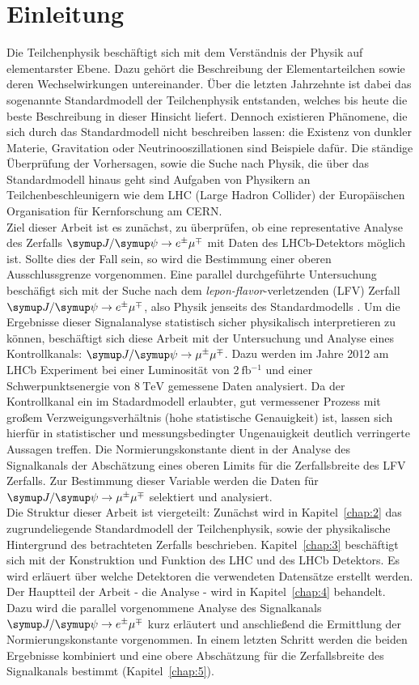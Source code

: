 \chapter{Einleitung}
%
Die Teilchenphysik beschäftigt sich mit dem Verständnis der Physik auf elementarster Ebene. Dazu gehört die Beschreibung der Elementarteilchen sowie deren Wechselwirkungen untereinander. Über die letzten Jahrzehnte ist dabei das sogenannte Standardmodell der Teilchenphysik entstanden, welches bis heute die beste Beschreibung in dieser Hinsicht liefert. Dennoch existieren Phänomene, die sich durch das Standardmodell nicht beschreiben lassen: die Existenz von dunkler Materie, Gravitation oder Neutrinooszillationen sind Beispiele dafür. Die ständige Überprüfung der Vorhersagen, sowie die Suche nach Physik, die über das Standardmodell hinaus geht sind Aufgaben von Physikern an Teilchenbeschleunigern wie dem LHC (Large Hadron Collider) der Europäischen Organisation für Kernforschung am CERN. \\
Ziel dieser Arbeit ist es zunächst, zu überprüfen, ob eine representative Analyse des Zerfalls $\signal$ mit Daten des LHCb-Detektors möglich ist. Sollte dies der Fall sein, so wird die Bestimmung einer oberen Ausschlussgrenze vorgenommen. Eine parallel durchgeführte Untersuchung beschäfigt sich mit der Suche nach dem \textit{lepon-flavor}-verletzenden (LFV) Zerfall $\signal$, also Physik jenseits des Standardmodells \cite{ba-maik}. Um die Ergebnisse dieser Signalanalyse statistisch sicher physikalisch interpretieren zu können, beschäftigt sich diese Arbeit mit der Untersuchung und Analyse eines Kontrollkanals: $\kontroll$.
Dazu werden im Jahre 2012 am LHCb Experiment bei einer Luminosität von $\SI{2}{\femto\barn^{-1}}$ und einer Schwerpunktsenergie von $\SI{8}{\tera\electronvolt}$ gemessene Daten analysiert. Da der Kontrollkanal ein im Stadardmodell erlaubter, gut vermessener Prozess mit großem Verzweigungsverhältnis (hohe statistische Genauigkeit) ist, lassen sich hierfür in statistischer und messungsbedingter Ungenauigkeit deutlich verringerte Aussagen treffen. Die Normierungskonstante dient in der Analyse des Signalkanals der Abschätzung eines oberen Limits für die Zerfallsbreite des LFV Zerfalls. Zur Bestimmung dieser Variable werden die Daten für $\kontroll$ selektiert und analysiert.\\
Die Struktur dieser Arbeit ist viergeteilt: Zunächst wird in Kapitel~\ref{chap:2} das zugrundeliegende Standardmodell der Teilchenphysik, sowie der physikalische Hintergrund des betrachteten Zerfalls beschrieben. Kapitel~\ref{chap:3} beschäftigt sich mit der Konstruktion und Funktion des LHC und des LHCb Detektors. Es wird erläuert über welche Detektoren die verwendeten Datensätze erstellt werden. Der Hauptteil der Arbeit - die Analyse - wird in Kapitel~\ref{chap:4} behandelt. Dazu wird die parallel vorgenommene Analyse des Signalkanals $\signal$ kurz erläutert und anschließend die Ermittlung der Normierungskonstante vorgenommen. In einem letzten Schritt werden die beiden Ergebnisse kombiniert und eine obere Abschätzung für die Zerfallsbreite des Signalkanals bestimmt (Kapitel~\ref{chap:5}).
